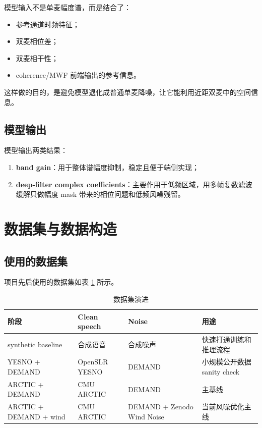 \documentclass[UTF8,12pt,a4paper]{ctexart}
\begin{document}
模型输入不是单麦幅度谱，而是结合了：

\begin{itemize}
  \item 参考通道时频特征；
  \item 双麦相位差；
  \item 双麦相干性；
  \item coherence/MWF 前端输出的参考信息。
\end{itemize}

这样做的目的，是避免模型退化成普通单麦降噪，让它能利用近距双麦中的空间信息。

\subsection{模型输出}

模型输出两类结果：

\begin{enumerate}
  \item \textbf{band gain}：用于整体谱幅度抑制，稳定且便于端侧实现；
  \item \textbf{deep-filter complex coefficients}：主要作用于低频区域，用多帧复数滤波缓解只做幅度 mask 带来的相位问题和低频风噪残留。
\end{enumerate}

\section{数据集与数据构造}

\subsection{使用的数据集}

项目先后使用的数据集如表 \ref{tab:datasets} 所示。

\begin{table}[H]
\centering
\caption{数据集演进}
\label{tab:datasets}
\begin{tabularx}{\textwidth}{p{3.2cm}p{3.2cm}p{3.5cm}X}
\toprule
\textbf{阶段} & \textbf{Clean speech} & \textbf{Noise} & \textbf{用途} \\
\midrule
synthetic baseline & 合成语音 & 合成噪声 & 快速打通训练和推理流程 \\
YESNO + DEMAND & OpenSLR YESNO & DEMAND & 小规模公开数据 sanity check \\
ARCTIC + DEMAND & CMU ARCTIC & DEMAND & 主基线 \\
ARCTIC + DEMAND + wind & CMU ARCTIC & DEMAND + Zenodo Wind Noise & 当前风噪优化主线 \\
\bottomrule
\end{tabularx}
\end{table}
\end{document}
